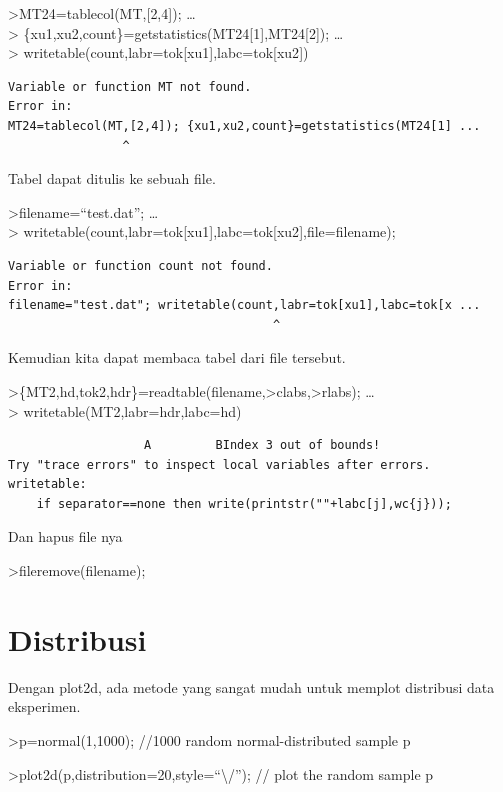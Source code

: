 \documentclass[
]{book}
\begin{document}
\textgreater MT24=tablecol(MT,{[}2,4{]}); \ldots{}\\
\textgreater{} \{xu1,xu2,count\}=getstatistics(MT24{[}1{]},MT24{[}2{]}); \ldots{}\\
\textgreater{} writetable(count,labr=tok{[}xu1{]},labc=tok{[}xu2{]})

\begin{verbatim}
Variable or function MT not found.
Error in:
MT24=tablecol(MT,[2,4]); {xu1,xu2,count}=getstatistics(MT24[1] ...
                ^
\end{verbatim}

Tabel dapat ditulis ke sebuah file.

\textgreater filename=``test.dat''; \ldots{}\\
\textgreater{} writetable(count,labr=tok{[}xu1{]},labc=tok{[}xu2{]},file=filename);

\begin{verbatim}
Variable or function count not found.
Error in:
filename="test.dat"; writetable(count,labr=tok[xu1],labc=tok[x ...
                                     ^
\end{verbatim}

Kemudian kita dapat membaca tabel dari file tersebut.

\textgreater\{MT2,hd,tok2,hdr\}=readtable(filename,\textgreater clabs,\textgreater rlabs); \ldots{}\\
\textgreater{} writetable(MT2,labr=hdr,labc=hd)

\begin{verbatim}
                   A         BIndex 3 out of bounds!
Try "trace errors" to inspect local variables after errors.
writetable:
    if separator==none then write(printstr(""+labc[j],wc{j}));
\end{verbatim}

Dan hapus file nya

\textgreater fileremove(filename);

\section{Distribusi}\label{distribusi}

Dengan plot2d, ada metode yang sangat mudah untuk memplot distribusi data eksperimen.

\textgreater p=normal(1,1000); //1000 random normal-distributed sample p

\textgreater plot2d(p,distribution=20,style=``\textbackslash/''); // plot the random sample p
\end{document}
